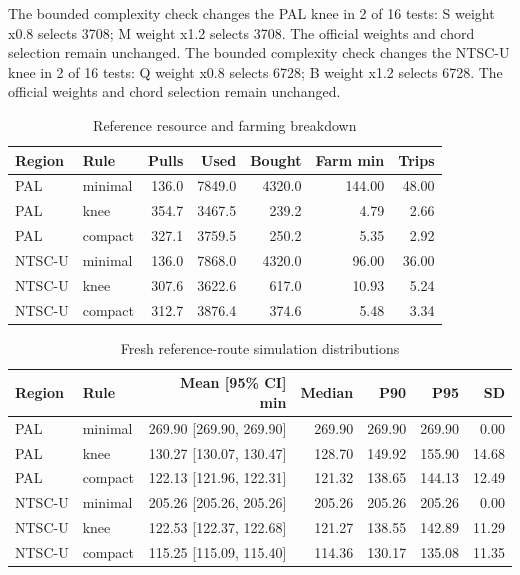 \documentclass[11pt]{article}
\theoremstyle{definition}\newtheorem{definition}[theorem]{Definition}
\begin{document}
The bounded complexity check changes the PAL knee in 2 of 16 tests: S weight x0.8 selects 3708; M weight x1.2 selects 3708. The official weights and chord selection remain unchanged. The bounded complexity check changes the NTSC-U knee in 2 of 16 tests: Q weight x0.8 selects 6728; B weight x1.2 selects 6728. The official weights and chord selection remain unchanged. 
\begin{table}[H]\centering\small
\begin{tabular}{llrrrrr}\toprule
Region & Rule & Pulls & Used & Bought & Farm min & Trips\\\midrule
PAL & minimal & 136.0 & 7849.0 & 4320.0 & 144.00 & 48.00\\
PAL & knee & 354.7 & 3467.5 & 239.2 & 4.79 & 2.66\\
PAL & compact & 327.1 & 3759.5 & 250.2 & 5.35 & 2.92\\
NTSC-U & minimal & 136.0 & 7868.0 & 4320.0 & 96.00 & 36.00\\
NTSC-U & knee & 307.6 & 3622.6 & 617.0 & 10.93 & 5.24\\
NTSC-U & compact & 312.7 & 3876.4 & 374.6 & 5.48 & 3.34\\
\bottomrule\end{tabular}
\caption{Reference resource and farming breakdown}\label{tab:result-11}\end{table}
\begin{table}[H]\centering\small
\begin{tabular}{llrrrrr}\toprule
Region & Rule & Mean [95\% CI] min & Median & P90 & P95 & SD\\\midrule
PAL & minimal & 269.90 [269.90, 269.90] & 269.90 & 269.90 & 269.90 & 0.00\\
PAL & knee & 130.27 [130.07, 130.47] & 128.70 & 149.92 & 155.90 & 14.68\\
PAL & compact & 122.13 [121.96, 122.31] & 121.32 & 138.65 & 144.13 & 12.49\\
NTSC-U & minimal & 205.26 [205.26, 205.26] & 205.26 & 205.26 & 205.26 & 0.00\\
NTSC-U & knee & 122.53 [122.37, 122.68] & 121.27 & 138.55 & 142.89 & 11.29\\
NTSC-U & compact & 115.25 [115.09, 115.40] & 114.36 & 130.17 & 135.08 & 11.35\\
\bottomrule\end{tabular}
\caption{Fresh reference-route simulation distributions}\label{tab:result-12}\end{table}
\end{document}

